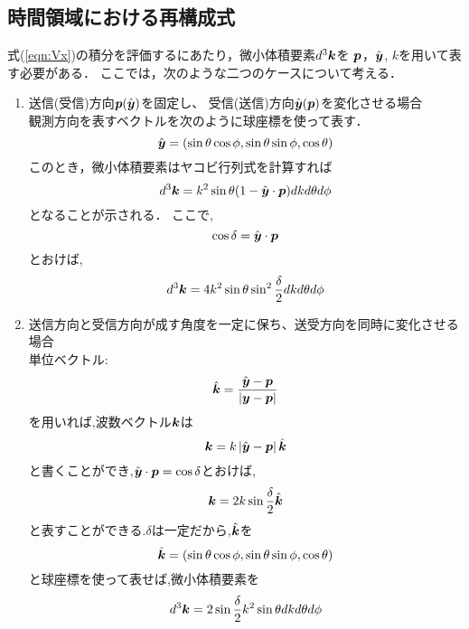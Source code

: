 \documentclass[10pt,a4j,dvipdfmx]{jarticle}
\begin{document}
\subsection{時間領域における再構成式}
式(\ref{eqn:Vx})の積分を評価するにあたり，微小体積要素$d^3\mbox{\boldmath $k$}$を 
$\mbox{\boldmath $p$}$，$\hat{\mbox{\boldmath $y$}}$, $k$を用いて表す必要がある．
ここでは，次のような二つのケースについて考える．
\begin{enumerate}
\item
	送信(受信)方向$\mbox{\boldmath $p$}(\hat{\mbox{\boldmath $y$}})$を固定し、
	受信(送信)方向$\hat{\mbox{\boldmath $y$}}(\mbox{\boldmath $p$})$を変化させる場合\\

	観測方向を表すベクトルを次のように球座標を使って表す．
	\begin{equation}
		\hat{\mbox{\boldmath $y$}}=(\sin\theta\cos\phi,\sin\theta\sin\phi, \cos\theta)
		\label{eqn:}
	\end{equation}
	このとき，微小体積要素はヤコビ行列式を計算すれば
	\begin{equation}
		d^3\mbox{\boldmath $k$}=k^2\sin\theta (1-\hat{\mbox{\boldmath $y$}}\cdot\mbox{\boldmath $p$})dkd\theta d\phi
		\label{eqn:}
	\end{equation}
	となることが示される．
	ここで,
	\begin{equation}
		\cos\delta=\hat{\mbox{\boldmath $y$}}\cdot\mbox{\boldmath $p$}
		\label{eqn:}
	\end{equation}
	とおけば,
	\begin{equation}
		d^3\mbox{\boldmath $k$}=4k^2\sin\theta \sin^2 \frac{\delta}{2} dkd\theta d\phi
		\label{eqn:}
	\end{equation}
\item
	送信方向と受信方向が成す角度を一定に保ち、送受方向を同時に変化させる場合\\

	単位ベクトル:
	\begin{equation}
		\hat{\mbox{\boldmath $k$}}=\frac{\hat{\mbox{\boldmath $y$}}-\mbox{\boldmath $p$}}
		{\left| \mbox{\boldmath $y$}-\mbox{\boldmath $p$} \right| }
		\label{eqn:}
	\end{equation}
	を用いれば,波数ベクトル$\mbox{\boldmath $k$}$は
	\begin{equation}
		\mbox{\boldmath $k$}= k\left| \hat{\mbox{\boldmath $y$}}-\mbox{\boldmath $p$} \right| \hat{\mbox{\boldmath $k$}} 
		\label{eqn:}
	\end{equation}
	と書くことができ,$\hat{\mbox{\boldmath $y$}} \cdot \mbox{\boldmath $p$}= \cos \delta$とおけば,	
	\begin{equation}
		\mbox{\boldmath $k$}= 2k \sin \frac{\delta}{2}\hat{\mbox{\boldmath $k$}} 
	\label{eqn:}
	\end{equation}
	と表すことができる.$\delta$は一定だから,$\hat{\mbox{\boldmath $k$}}$を
	\begin{equation}
		\hat{\mbox{\boldmath $k$}}=(\sin\theta\cos\phi,\sin\theta\sin\phi, \cos\theta)
		\label{eqn:}
	\end{equation}
	と球座標を使って表せば,微小体積要素を
	\begin{equation}
		d^3\mbox{\boldmath $k$}=2\sin\frac{\delta}{2} 
		k^2 \sin\theta dkd\theta d\phi
		\label{eqn:}
	\end{equation}
\end{enumerate}
\end{document}
